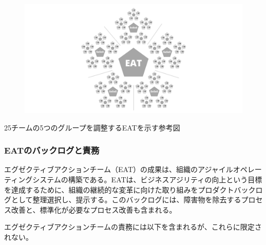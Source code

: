 \documentclass[12pt,a4paper,parskip=full]{scrartcl}
\begin{document}
\begin{figure}[H]
    \centering
    \includegraphics[scale=0.15]{3.png}
    
\end{figure}

25チームの5つのグループを調整するEATを示す参考図

\subsubsection{EATのバックログと責務}\label{EAT-backlog-and-responsibilities}

エグゼクティブアクションチーム（EAT）の成果は、組織のアジャイルオペレーティングシステムの構築である。EATは、ビジネスアジリティの向上という目標を達成するために、組織の継続的な変革に向けた取り組みをプロダクトバックログとして整理選択し、提示する。このバックログには、障害物を除去するプロセス改善と、標準化が必要なプロセス改善も含まれる。

エグゼクティブアクションチームの責務には以下を含まれるが、これらに限定されない。
\end{document}
